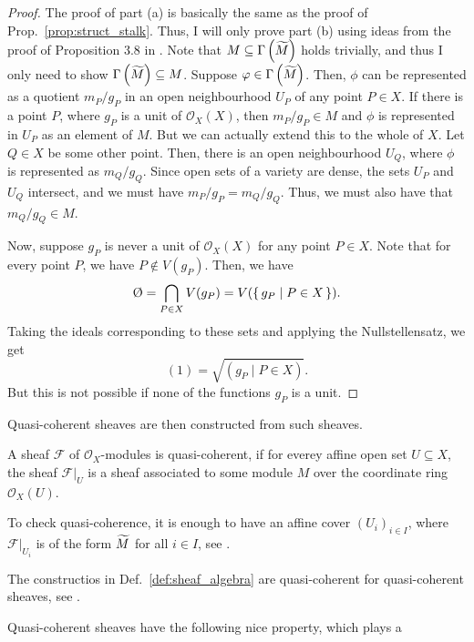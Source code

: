 \begin{proof}
  The proof of part (a) is basically the same as the proof of
  Prop.~\ref{prop:struct_stalk}. Thus, I will only prove part (b) using
  ideas from the proof of Proposition 3.8 in \cite{gathmann_new}. Note
  that $M\subseteq\Gamma\left(\widetilde{M}\right)$ holds trivially, and thus I
  only need to show $\Gamma\left(\widetilde{M}\right)\subseteq M$.
  Suppose $\varphi\in\Gamma\left(\widetilde{M}\right)$. Then, $\phi$ can be represented
  as a quotient $m_{P}/g_{P}$ in an open neighbourhood $U_{P}$ of any point
  $P\in X$. If there is a point $P$, where $g_{P}$ is a unit of
  $\mathscr{O}_{X}(X)$, then $m_{P}/g_{P}\in M$ and $\phi$ is represented
  in $U_{P}$ as an element of $M$. But we can actually extend this to the
  whole of $X$. Let $Q\in X$ be some other point. Then, there is an open
  neighbourhood $U_{Q}$, where $\phi$ is represented as $m_{Q}/g_{Q}$. Since
  open sets of a variety are dense, the sets $U_{P}$ and $U_{Q}$ intersect,
  and we must have $m_{P}/g_{P}=m_{Q}/g_{Q}$. Thus, we must also have that
  $m_{Q}/g_{Q}\in M$.

  Now, suppose $g_{P}$ is never a unit of $\mathscr{O}_{X}(X)$ for any
  point $P\in X$. Note that for every point $P$, we have $P\not\in V(g_{P})$.
  Then, we have
  \[
    \emptyset=\bigcap_{P\in X}V(g_{P})=V(\set{g_{P}\mid P\in X}).
  \]
  Taking the ideals corresponding to these sets and applying the
  Nullstellensatz, we get
  \[
    (1)=\sqrt{(g_{P}\mid P\in X)}.
  \]
  But this is not possible if none of the functions $g_{P}$ is a unit.
\end{proof}
Quasi-coherent sheaves are then constructed from such sheaves.
\begin{defin}
  A sheaf $\mathscr{F}$ of $\mathscr{O}_{X}$-modules is quasi-coherent, if
  for everey affine open set $U\subseteq X$, the sheaf $\mathscr{F}\vert_{U}$
  is a sheaf associated to some module $M$ over the coordinate ring
  $\mathscr{O}_{X}(U)$.
\end{defin}
\begin{rem}
  To check quasi-coherence, it is enough to have an affine cover
  $(U_{i})_{i\in I}$, where $\mathscr{F}\vert_{U_{i}}$ is of the form $\widetilde{M}$ for
  all $i\in I$, see \cite{gathmann}.
\end{rem}
\begin{rem}
  The constructios in Def.~\ref{def:sheaf_algebra} are quasi-coherent
  for quasi-coherent sheaves, see \cite{gathmann}.
\end{rem}
Quasi-coherent sheaves have the following nice property, which plays a
